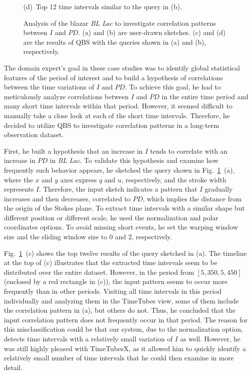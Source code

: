 \begin{figure}[tb]
    \footnotesize{\sf(d)~Top 12 time intervals similar to the query in (b).}
    \caption{Analysis of the blazar \emph{BL Lac} to investigate correlation patterns between $I$ and $PD$. (a) and (b) are user-drawn sketches. (c) and (d) are the results of QBS with the queries shown in (a) and (b), respectively.}
    \label{fig:EvaluationQueryResults}
\end{figure}
%
The domain expert's goal in these case studies was to identify global statistical features of the period of interest and to build a hypothesis of correlations between the time variations of $I$ and $PD$.
To achieve this goal, he had to meticulously analyze correlations between $I$ and $PD$ in the entire time period and many short time intervals within that period.
However, it seemed difficult to manually take a close look at each of the short time intervals.
Therefore, he decided to utilize QBS to investigate correlation patterns in a long-term observation dataset.

First, he built a hypothesis that an increase in $I$ tends to correlate with an increase in $PD$ in \emph{BL Lac}.
To validate this hypothesis and examine how frequently such behavior appears, he sketched the query shown in Fig.~\ref{fig:EvaluationQueryResults}~(a), 
where the $x$ and $y$ axes express $q$ and $u$, respectively, 
and the stroke width represents $I$.
Therefore, the input sketch indicates a pattern 
that $I$ gradually increases and then decreases, correlated to $PD$, which implies the distance from the origin of the Stokes plane.
To extract time intervals with a similar shape but different position or different scale, he used the normalization and polar coordinates options. 
To avoid missing short events, he set the warping window size and the sliding window size to 0 and 2, respectively.

Fig.~\ref{fig:EvaluationQueryResults}~(c) shows the top twelve results of the query sketched in (a).
The timeline at the top of (c) illustrates 
that the extracted time intervals seem to be distributed over the entire dataset.
However, in the period from $[5{,}350, 5{,}450]$ (enclosed by a red rectangle in (c)), 
the input pattern seems to occur more frequently than in other periods.
Visiting all time intervals in this period individually and analyzing them in the TimeTubes view,
some of them include the correlation pattern in (a),
but others do not.
Thus, he concluded that the input correlation pattern does not frequently occur in that period.
The reason for this misclassification could be that our system, due to the normalization option, detects time intervals with a relatively small variation of $I$ as well.
However, he was still highly pleased with TimeTubesX, as it allowed him to quickly identify a relatively small number of time intervals that he could then examine in more detail.

